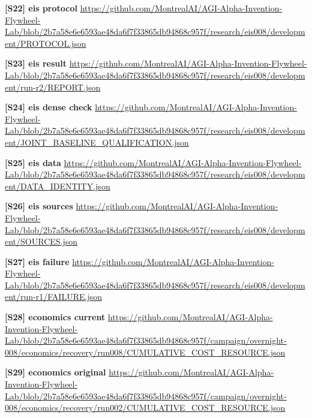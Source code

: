 \documentclass[11pt,letterpaper]{article}
\begin{document}
\begin{samepage}\small\textbf{[S22] eis protocol} \url{https://github.com/MontrealAI/AGI-Alpha-Invention-Flywheel-Lab/blob/2b7a58e6e6593ae48da6f7f33865db94868c957f/research/eis008/development/PROTOCOL.json}\par\normalsize\end{samepage}
\begin{samepage}\small\textbf{[S23] eis result} \url{https://github.com/MontrealAI/AGI-Alpha-Invention-Flywheel-Lab/blob/2b7a58e6e6593ae48da6f7f33865db94868c957f/research/eis008/development/run-r2/REPORT.json}\par\normalsize\end{samepage}
\begin{samepage}\small\textbf{[S24] eis dense check} \url{https://github.com/MontrealAI/AGI-Alpha-Invention-Flywheel-Lab/blob/2b7a58e6e6593ae48da6f7f33865db94868c957f/research/eis008/development/JOINT_BASELINE_QUALIFICATION.json}\par\normalsize\end{samepage}
\begin{samepage}\small\textbf{[S25] eis data} \url{https://github.com/MontrealAI/AGI-Alpha-Invention-Flywheel-Lab/blob/2b7a58e6e6593ae48da6f7f33865db94868c957f/research/eis008/development/DATA_IDENTITY.json}\par\normalsize\end{samepage}
\begin{samepage}\small\textbf{[S26] eis sources} \url{https://github.com/MontrealAI/AGI-Alpha-Invention-Flywheel-Lab/blob/2b7a58e6e6593ae48da6f7f33865db94868c957f/research/eis008/development/SOURCES.json}\par\normalsize\end{samepage}
\begin{samepage}\small\textbf{[S27] eis failure} \url{https://github.com/MontrealAI/AGI-Alpha-Invention-Flywheel-Lab/blob/2b7a58e6e6593ae48da6f7f33865db94868c957f/research/eis008/development/run-r1/FAILURE.json}\par\normalsize\end{samepage}
\begin{samepage}\small\textbf{[S28] economics current} \url{https://github.com/MontrealAI/AGI-Alpha-Invention-Flywheel-Lab/blob/2b7a58e6e6593ae48da6f7f33865db94868c957f/campaign/overnight-008/economics/recovery/run008/CUMULATIVE_COST_RESOURCE.json}\par\normalsize\end{samepage}
\begin{samepage}\small\textbf{[S29] economics original} \url{https://github.com/MontrealAI/AGI-Alpha-Invention-Flywheel-Lab/blob/2b7a58e6e6593ae48da6f7f33865db94868c957f/campaign/overnight-008/economics/recovery/run002/CUMULATIVE_COST_RESOURCE.json}\par\normalsize\end{samepage}
\end{document}
